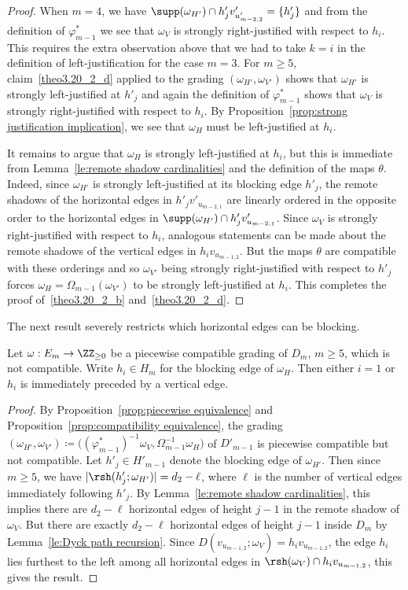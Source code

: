\begin{proof}
 When $m=4$, we have $\supp(\omega_{H'})\cap h'_jv'_{u'_{m-2,2}}=\{h'_j\}$ and from the definition of $\varphi^*_{m-1}$ we see that $\omega_V$ is strongly right-justified with respect to $h_i$.
 This requires the extra observation above that we had to take $k=i$ in the definition of left-justification for the case $m=3$.
 For $m\ge5$, claim~\ref{theo3.20_2_d} applied to the grading $(\omega_{H'},\omega_{V'})$ shows that $\omega_{H'}$ is strongly left-justified at $h'_j$ and again the definition of $\varphi^*_{m-1}$ shows that $\omega_V$ is strongly right-justified with respect to $h_i$. 
 By Proposition~\ref{prop:strong justification implication}, we see that $\omega_H$ must be left-justified at $h_i$. 

 It remains to argue that $\omega_H$ is strongly left-justified at $h_i$, but this is immediate from Lemma~\ref{le:remote shadow cardinalities} and the definition of the maps $\theta$. 
 Indeed, since $\omega_{H'}$ is strongly left-justified at its blocking edge $h'_j$, the remote shadows of the horizontal edges in $h'_jv'_{u_{m-2,1}}$ are linearly ordered in the opposite order to the horizontal edges in $\supp(\omega_{H'})\cap h'_jv'_{u_{m-2,1}}$. 
 Since $\omega_V$ is strongly right-justified with respect to $h_i$, analogous statements can be made about the remote shadows of the vertical edges in $h_iv_{u_{m-1,2}}$. 
 But the maps $\theta$ are compatible with these orderings and so $\omega_{V'}$ being strongly right-justified with respect to $h'_j$ forces $\omega_H=\Omega_{m-1}(\omega_{V'})$ to be strongly left-justified at $h_i$.
 This completes the proof of~\ref{theo3.20_2_b} and~\ref{theo3.20_2_d}.
\end{proof}

The next result severely restricts which horizontal edges can be blocking.
\begin{corollary}
 Let $\omega:E_m\to\ZZ_{\ge0}$ be a piecewise compatible grading of $D_m$, $m\ge5$, which is not compatible.
 Write $h_i\in H_m$ for the blocking edge of $\omega_H$.
 Then either $i=1$ or $h_i$ is immediately preceded by a vertical edge.
\end{corollary}
\begin{proof}
 By Proposition~\ref{prop:piecewise equivalence} and Proposition~\ref{prop:compatibility equivalence}, the grading $(\omega_{H'},\omega_{V'})\coloneqq \big((\varphi^*_{m-1})^{-1}\omega_V,\Omega_{m-1}^{-1}\omega_H)$ of $D'_{m-1}$ is piecewise compatible but not compatible.
 Let $h'_j\in H'_{m-1}$ denote the blocking edge of $\omega_{H'}$.
 Then since $m\ge5$, we have $|\rsh(h'_j;\omega_{H'})|=d_2-\ell$, where $\ell$ is the number of vertical edges immediately following $h'_j$.
 By Lemma~\ref{le:remote shadow cardinalities}, this implies there are $d_2-\ell$ horizontal edges of height $j-1$ in the remote shadow of $\omega_V$.
 But there are exactly $d_2-\ell$ horizontal edges of height $j-1$ inside $D_m$ by Lemma~\ref{le:Dyck path recursion}.
 Since $D(v_{u_{m-1,2}};\omega_V)=h_iv_{u_{m-1,2}}$, the edge $h_i$ lies furthest to the left among all horizontal edges in $\rsh(\omega_V)\cap h_iv_{u_{m-1,2}}$, this gives the result.
\end{proof}

